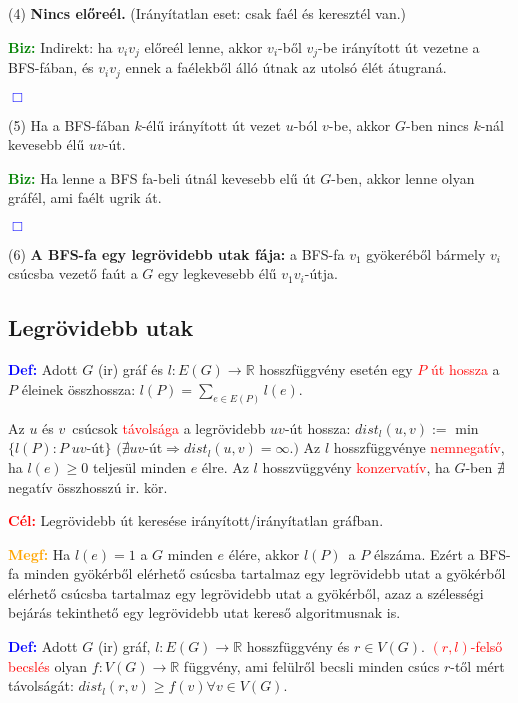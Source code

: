 \documentclass[12pt]{article}
\begin{document}
			(4) \textbf{Nincs előreél.} (Irányítatlan eset: csak faél és keresztél van.) 

			\textbf{\textcolor{green}{Biz:}} Indirekt: ha $v_i v_j$ előreél lenne, akkor $v_i$-ből $v_j$-be irányított út vezetne a BFS-fában, és $v_i v_j$ ennek a faélekből álló útnak az utolsó élét átugraná. \raggedright \textcolor{blue}{$\Box$} 

			(5) Ha a BFS-fában $k$-élű irányított út vezet $u$-ból $v$-be, akkor $G$-ben nincs $k$-nál kevesebb élű $uv$-út.

			\textbf{\textcolor{green}{Biz:}} Ha lenne a BFS fa-beli útnál kevesebb elű út $G$-ben, akkor lenne olyan gráfél, ami faélt ugrik át. \raggedright \textcolor{blue}{$\Box$} 

			(6) \textbf{A BFS-fa egy legrövidebb utak fája:} a BFS-fa $v_1$ gyökeréből bármely $v_i$ csúcsba vezető faút a $G$ egy legkevesebb élű $v_1 v_i$-útja.

		\subsection{Legrövidebb utak}
				
			\textbf{\textcolor{blue}{Def:}} Adott $G$ (ir) gráf és $l : E(G) \rightarrow \mathbb{R}$ hosszfüggvény esetén egy \textcolor{red}{$P$ út hossza} a $P$ éleinek összhossza: $l(P) = \sum_{e\in E(P)} l(e)$.

			Az $u$ és $v$ csúcsok \textcolor{red}{távolsága} a legrövidebb $uv$-út hossza: $dist_l(u,v):=$ min$\{l(P):P \;uv$-út$\}$ $(\nexists uv$-út$\Rightarrow dist_l (u,v)= \infty.)$ Az $l$  hosszfüggvénye \textcolor{red}{nemnegatív}, ha $l(e) \geq 0$ teljesül minden $e$ élre. Az $l$ hosszvüggvény \textcolor{red}{konzervatív}, ha $G$-ben $\nexists$ negatív összhosszú ir. kör.

			\textbf{\textcolor{red}{Cél:}} Legrövidebb út keresése irányított/irányítatlan gráfban.

			\textbf{\textcolor{orange}{Megf:}} Ha $l(e) = 1 $ a $G$ minden $e$ élére, akkor $l(P)$ a $P$ élszáma. Ezért a BFS-fa minden gyökérből elérhető csúcsba tartalmaz egy legrövidebb utat a gyökérből elérhető csúcsba tartalmaz egy legrövidebb utat a gyökérből, azaz a szélességi bejárás tekinthető egy legrövidebb utat kereső algoritmusnak is. 

			\textbf{\textcolor{blue}{Def:}} Adott $G$ (ir) gráf, $l : E(G) \rightarrow \mathbb{R}$ hosszfüggvény és $r \in V(G)$. \textcolor{red}{$(r,l)$-felső becslés} olyan $f: V(G) \rightarrow \mathbb{R}$ függvény, ami felülről becsli minden csúcs $r$-től mért távolságát: $dist_l (r,v) \geq f(v) \forall v \in V(G)$.
\end{document}
